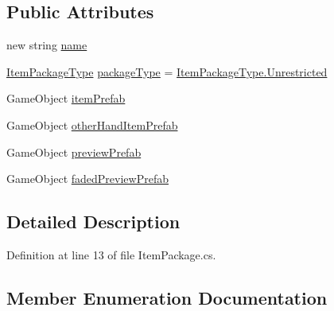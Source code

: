 \subsection*{Public Attributes}
\begin{DoxyCompactItemize}
\item 
new string \mbox{\hyperlink{class_valve_1_1_v_r_1_1_interaction_system_1_1_item_package_adae97d8e1b191ccfb7ebafa608ba9d85}{name}}
\item 
\mbox{\hyperlink{class_valve_1_1_v_r_1_1_interaction_system_1_1_item_package_a8d2fe408f7b1222964bcb4efe22ff9a4}{Item\+Package\+Type}} \mbox{\hyperlink{class_valve_1_1_v_r_1_1_interaction_system_1_1_item_package_a2e9d3726fe44f4f2fc5a9fa9a906868b}{package\+Type}} = \mbox{\hyperlink{class_valve_1_1_v_r_1_1_interaction_system_1_1_item_package_a8d2fe408f7b1222964bcb4efe22ff9a4a89c6caacc7047b0a535412d7f939f870}{Item\+Package\+Type.\+Unrestricted}}
\item 
Game\+Object \mbox{\hyperlink{class_valve_1_1_v_r_1_1_interaction_system_1_1_item_package_af195c042577d09ed6b10a6feb05dff08}{item\+Prefab}}
\item 
Game\+Object \mbox{\hyperlink{class_valve_1_1_v_r_1_1_interaction_system_1_1_item_package_ae44ffa29d6e137f6dadc09a359ae91b4}{other\+Hand\+Item\+Prefab}}
\item 
Game\+Object \mbox{\hyperlink{class_valve_1_1_v_r_1_1_interaction_system_1_1_item_package_acb818fd48d980318ce81d8116a05b116}{preview\+Prefab}}
\item 
Game\+Object \mbox{\hyperlink{class_valve_1_1_v_r_1_1_interaction_system_1_1_item_package_af4a8d4ffaa214fee768ffee371483cba}{faded\+Preview\+Prefab}}
\end{DoxyCompactItemize}


\subsection{Detailed Description}


Definition at line 13 of file Item\+Package.\+cs.



\subsection{Member Enumeration Documentation}
\mbox{\label{class_valve_1_1_v_r_1_1_interaction_system_1_1_item_package_a8d2fe408f7b1222964bcb4efe22ff9a4}} 
